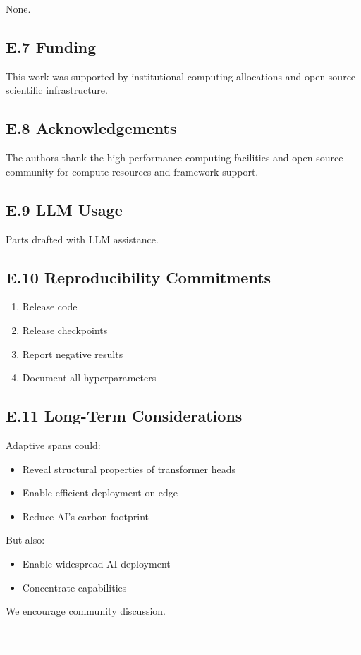 None.

\subsection{E.7 Funding}

This work was supported by institutional computing allocations and open-source scientific infrastructure.

\subsection{E.8 Acknowledgements}

The authors thank the high-performance computing facilities and open-source community for compute resources and framework support.

\subsection{E.9 LLM Usage}

Parts drafted with LLM assistance.

\subsection{E.10 Reproducibility Commitments}

\begin{enumerate}
\item Release code
\item Release checkpoints
\item Report negative results
\item Document all hyperparameters

\end{enumerate}
\subsection{E.11 Long-Term Considerations}

Adaptive spans could:

\begin{itemize}
\item Reveal structural properties of transformer heads
\item Enable efficient deployment on edge
\item Reduce AI's carbon footprint

\end{itemize}
But also:

\begin{itemize}
\item Enable widespread AI deployment
\item Concentrate capabilities

\end{itemize}
We encourage community discussion.
\begin{lstlisting}

---
\end{lstlisting}